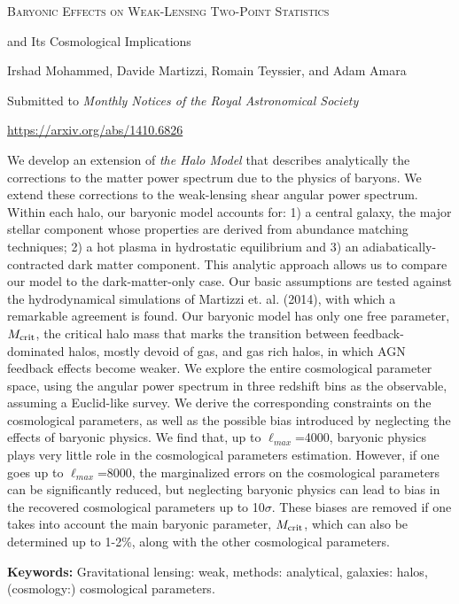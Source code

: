 \documentclass[
  11pt,
  twoside,
  openright,
  titlepage,
  headings=optiontoheadandtoc
]{scrbook}
\begin{document}
\begin{publishedpaper}
  {\fontsize{18}{22}\selectfont\scshape
   Baryonic Effects on Weak-Lensing Two-Point Statistics\par
   and Its Cosmological Implications\par}

  \vspace{1.25em}

  {\large
   Irshad Mohammed, Davide Martizzi, Romain Teyssier, and Adam Amara\par}

  \vspace{1.25em}
  {\small
   Submitted to \textit{Monthly Notices of the Royal Astronomical Society}\par
   \url{https://arxiv.org/abs/1410.6826}\par}
\end{publishedpaper}

\begin{paperabstract}
We develop an extension of \textit{the Halo Model} that describes analytically the corrections to the matter power spectrum due to the physics of baryons. We extend these corrections to the weak-lensing shear angular power spectrum. Within each halo, our baryonic model accounts for: 1) a central galaxy, the major stellar component whose properties are derived from abundance matching techniques; 2) a hot plasma in hydrostatic equilibrium and 3) an adiabatically-contracted dark matter component. This analytic approach allows us to compare our model to the dark-matter-only case. Our basic assumptions are tested against the hydrodynamical simulations of Martizzi et. al. (2014), with which a remarkable agreement is found. Our baryonic model has only one free parameter, $M_{\rm crit}$, the critical halo mass that marks the transition between feedback-dominated halos, mostly devoid of gas, and gas rich halos, in which AGN feedback effects become weaker.  We explore the entire cosmological parameter space, using the angular power spectrum in three redshift bins as the observable, assuming a Euclid-like survey. We derive the corresponding constraints on the cosmological parameters, as well as the possible bias introduced by neglecting the effects of baryonic physics.  We find that, up to $\ell_{max}$=4000, baryonic physics plays very little role in the cosmological parameters estimation. However, if one goes up to $\ell_{max}$=8000, the  marginalized errors on the cosmological parameters can be significantly reduced, but neglecting baryonic physics can lead to bias in the recovered cosmological parameters  up to 10$\sigma$. These biases are removed if one takes into account the main baryonic parameter, $M_{\rm crit}$, which can also be determined up to 1-2\%, along with the other cosmological parameters.  
\end{paperabstract}
\vspace{1em}
\noindent\textbf{Keywords:}
Gravitational lensing: weak, 
methods: analytical,
galaxies: halos,
(cosmology:) cosmological parameters.
\par
\vspace{1em}
\end{document}
